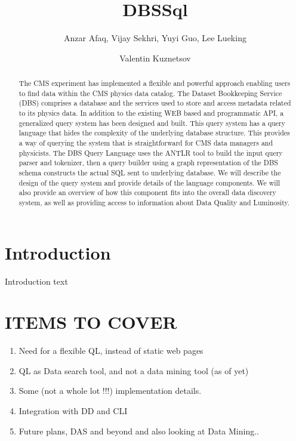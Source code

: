 \documentclass[a4paper]{jpconf}
\begin{document}
\title{DBSSql}

\author{Anzar Afaq, Vijay Sekhri, Yuyi Guo, Lee Lueking}
\address{Fermilab, Batavia, Illinois, USA}

\author{Valentin Kuznetsov}
\address{Cornell University, Ithaca, NY 14853, USA}

\begin{abstract}
The CMS experiment has implemented a flexible and 
powerful approach enabling users to find data within 
the CMS physics data catalog. The Dataset Bookkeeping 
Service (DBS) comprises a database and the services 
used to store and access metadata related to its physics 
data. In addition to the existing WEB based and programmatic 
API, a generalized query system has been designed and built. 
This query system has a query language that hides the 
complexity of the underlying database structure. This provides 
a way of querying the system that is straightforward for 
CMS data managers and physicists. The DBS Query Language 
uses the ANTLR tool to build the input query parser and tokenizer, 
then a query builder using a graph representation of the 
DBS schema constructs the actual SQL sent to underlying database. 
We will describe the design of the query system and provide 
details of the language components. We will also provide an 
overview of how this component fits into the overall data 
discovery system, as well as providing access to information 
about Data Quality and Luminosity.
\end{abstract}

\section{Introduction}
Introduction text

\section{ITEMS TO COVER}
\begin{enumerate}
\item Need for a flexible QL, instead of static web pages
\item QL as Data search tool, and not a data mining tool (as of yet)
\item Some (not a whole lot !!!) implementation details.
\item Integration with DD and CLI
\item Future plans, DAS and beyond and also looking at Data Mining..
\end{enumerate}
\end{document}
